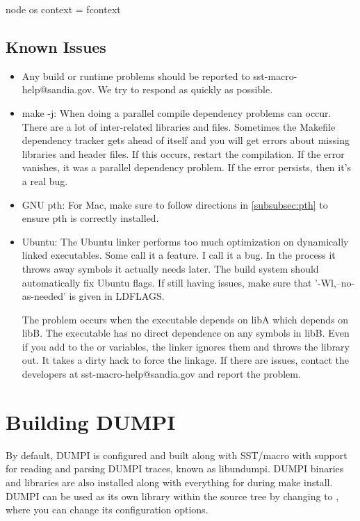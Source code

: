 \begin{ViFile}
node {
 os {
  context = fcontext
 }
}
\end{ViFile}

\subsection{Known Issues}
\label{subsec:build:issues}


\begin{itemize}
\item Any build or runtime problems should be reported to sst-macro-help@sandia.gov.  We try to respond as quickly as possible.
\item make -j: When doing a parallel compile dependency problems can occur.  
There are a lot of inter-related libraries and files.  
Sometimes the Makefile dependency tracker gets ahead of itself and you will get errors about missing libraries and header files.
If this occurs, restart the compilation.  If the error vanishes, it was a parallel dependency problem.
If the error persists, then it's a real bug.
\item GNU pth: For Mac, make sure to follow directions in \ref{subsubsec:pth} to ensure pth is correctly installed.
\item Ubuntu: The Ubuntu linker performs too much optimization on dynamically linked executables.
Some call it a feature.  I call it a bug.
In the process it throws away symbols it actually needs later. The build system should automatically fix Ubuntu flags.
If still having issues, make sure that '-Wl,--no-as-needed' is given in LDFLAGS.

The problem occurs when the executable depends on libA which depends on libB.
The executable has no direct dependence on any symbols in libB.
Even if you add  to the  or  variables,
the linker ignores them and throws the library out.
It takes a dirty hack to force the linkage.
If there are issues, contact the developers at sst-macro-help@sandia.gov and report the problem. 
\end{itemize}

\section{Building DUMPI}
\label{sec:building:dumpi}

By default, DUMPI is configured and built along with SST/macro with support for reading and parsing DUMPI traces, known as libundumpi.  
DUMPI binaries and libraries are also installed along with everything for \sstmacro during make install.   
DUMPI can be used as its own library within the \sstmacro source tree by changing to , 
where you can change its configuration options.  

